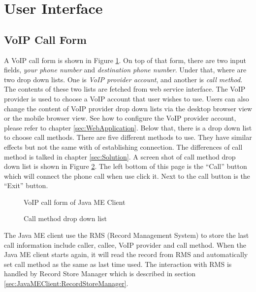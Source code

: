 \section{User Interface}
\label{sec:JavaMEClient:UserInterface}

\subsection{VoIP Call Form}
\label{sec:JavaMEClient:UserInterface:VoIPCallForm}

A VoIP call form is shown in Figure \ref{fig:VoIPCallFormOfJavaMEClient}. On top of that form, there are two input fields, \textit{your phone number} and \textit{destination phone number}. Under that, where are two drop down lists. One is \textit{VoIP provider account}, and another is \textit{call method}. The contents of these two lists are fetched from web service interface. The VoIP provider is used to choose a VoIP account that user wishes to use. Users can also change the content of VoIP provider drop down lists via the desktop browser view or the mobile browser view. See how to configure the VoIP provider account, please refer to chapter \ref{sec:WebApplication}. Below that, there is a drop down list to choose call methods. There are five different methods to use. They have similar effects but not the same with of establishing connection. The differences of call method is talked in chapter \ref{sec:Solution}. A screen shot of call method drop down list is shown in Figure \ref{fig:CallMethodDropDownList}. The left bottom of this page is the ``Call'' button which will connect the phone call when use click it. Next to the call button is the ``Exit'' button.

\begin{figure}[!hbtp]
\centering
{}
\caption{VoIP call form of Java ME Client}
\label{fig:VoIPCallFormOfJavaMEClient}
\end{figure}

\begin{figure}[!hbtp]
\centering
{}
\caption{Call method drop down list}
\label{fig:CallMethodDropDownList}
\end{figure}

The Java ME client use the RMS (Record Management System) to store the last call information include caller, callee, VoIP provider and call method. When the Java ME client starts again, it will read the record from RMS and automatically set call method as the same as last time used. The interaction with RMS is handled by \textsf{Record Store Manager} which is described in section \ref{sec:JavaMEClient:RecordStoreManager}.

